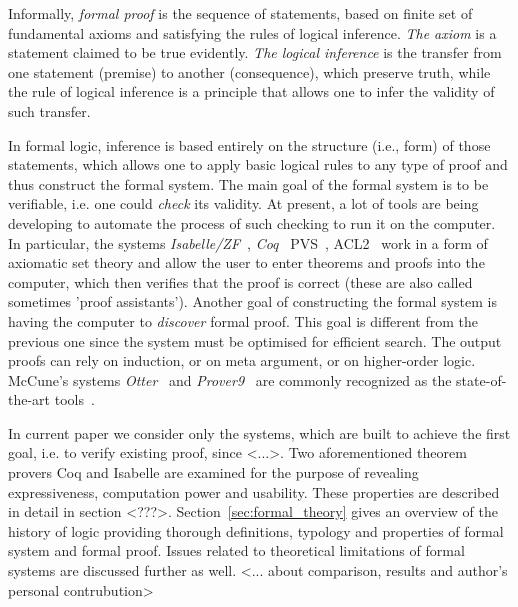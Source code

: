 \documentclass[article]{aaltoseries}
\begin{document}

Informally, \textit{formal proof} is the sequence of statements, based on finite set of fundamental axioms and satisfying the rules of logical inference. \textit{The axiom} is a statement claimed to be true evidently. \textit{The logical inference} is the transfer from one statement (premise) to another (consequence), which preserve truth, while the rule of logical inference is a principle that allows one to infer the validity of such transfer. 

In formal logic, inference is based entirely on the structure (i.e., form) of those statements, which allows one to apply basic logical rules to any type of proof and thus construct the formal system.
The main goal of the formal system is to be verifiable, i.e. one could \textit{check} its validity. At present, a lot of tools are being developing to automate the process of such checking to run it on the computer. In particular, the systems \textit{Isabelle/ZF}~\cite{Isabelle}, \textit{Coq}~\cite{Coq} PVS~\cite{Pvs}, ACL2~\cite{Acl} work in a form of axiomatic set theory and allow the user to enter theorems and proofs into the computer, which then verifies that the proof is correct (these are also called sometimes 'proof assistants').
Another goal of constructing the formal system is having the computer to \textit{discover} formal proof. This goal is different from the previous one since the system must be optimised for efficient search. The output proofs can rely on induction, or on meta argument, or on higher-order logic. McCune’s systems \textit{Otter}~\cite{Otter} and \textit{Prover9}~\cite{Prover9} are commonly recognized as the state-of-the-art tools~\cite{Com00}.

In current paper we consider only the systems, which are built to achieve the first goal, i.e. to verify existing proof, since <...>. Two aforementioned theorem provers Coq and Isabelle are examined for the purpose of revealing expressiveness, computation power and usability. These properties are described in detail in section <???>. Section~\ref{sec:formal_theory} gives an overview of the history of logic providing thorough definitions, typology and properties of formal system and formal proof. Issues related to theoretical limitations of formal systems are discussed further as well. <... about comparison, results and author's personal contrubution>
\end{document}
